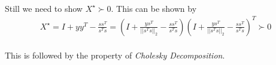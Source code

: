 \paragraph{}
Still we need to show $X^\star \succ 0$. This can be shown by
\begin{align*}
X^\star = I + yy^T - \frac{ss^T}{s^Ts} = (I+\frac{ys^T}{||s^Ts||_2}-\frac{ss^T}{s^Ts})(I+\frac{ys^T}{||s^Ts||_2}-\frac{ss^T}{s^Ts})^T \succ 0
\end{align*}
\paragraph{}
This is followed by the property of \textit{Cholesky Decomposition}.